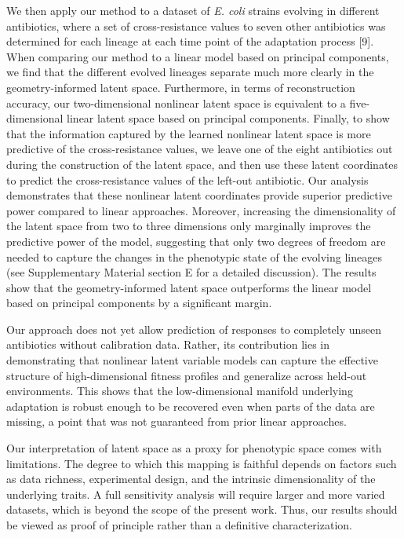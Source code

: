 \documentclass[
]{scrartcl}
\begin{document}
\begin{refsegment}
We then apply our method to a dataset of \emph{E. coli} strains evolving
in different antibiotics, where a set of cross-resistance values to
seven other antibiotics was determined for each lineage at each time
point of the adaptation process {[}9{]}. When comparing our method to a
linear model based on principal components, we find that the different
evolved lineages separate much more clearly in the geometry-informed
latent space. Furthermore, in terms of reconstruction accuracy, our
two-dimensional nonlinear latent space is equivalent to a
five-dimensional linear latent space based on principal components.
Finally, to show that the information captured by the learned nonlinear
latent space is more predictive of the cross-resistance values, we leave
one of the eight antibiotics out during the construction of the latent
space, and then use these latent coordinates to predict the
cross-resistance values of the left-out antibiotic. Our analysis
demonstrates that these nonlinear latent coordinates provide superior
predictive power compared to linear approaches. Moreover, increasing the
dimensionality of the latent space from two to three dimensions only
marginally improves the predictive power of the model, suggesting that
only two degrees of freedom are needed to capture the changes in the
phenotypic state of the evolving lineages (see Supplementary Material
section E for a detailed discussion). The results show that the
geometry-informed latent space outperforms the linear model based on
principal components by a significant margin.

\textcolor{tempcolor}{ Our approach
does not yet allow prediction of responses to completely unseen
antibiotics without calibration data. Rather, its contribution lies in
demonstrating that nonlinear latent variable models can capture the
effective structure of high-dimensional fitness profiles and generalize
across held-out environments. This shows that the low-dimensional
manifold underlying adaptation is robust enough to be recovered even
when parts of the data are missing, a point that was not guaranteed from
prior linear approaches. }

\textcolor{tempcolor}{ Our
interpretation of latent space as a proxy for phenotypic space comes
with limitations. The degree to which this mapping is faithful depends
on factors such as data richness, experimental design, and the intrinsic
dimensionality of the underlying traits. A full sensitivity analysis
will require larger and more varied datasets, which is beyond the scope
of the present work. Thus, our results should be viewed as proof of
principle rather than a definitive characterization. }


\end{refsegment}
\end{document}

